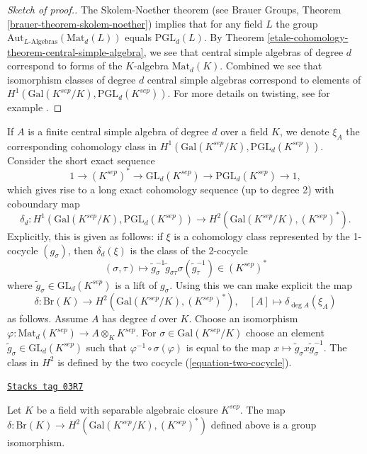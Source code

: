 \begin{proof}[Sketch of proof.]
The Skolem-Noether theorem (see
Brauer Groups, Theorem \ref{brauer-theorem-skolem-noether})
implies that for any field $L$ the group
$\text{Aut}_{L\text{-Algebras}}(\text{Mat}_d(L))$
equals $\text{PGL}_d(L)$. By
Theorem \ref{etale-cohomology-theorem-central-simple-algebra}, we see that
central simple algebras of degree $d$ correspond
to forms of the $K$-algebra $\text{Mat}_d(K)$.
Combined we see that isomorphism classes of degree $d$ central
simple algebras correspond to elements of
$H^1(\text{Gal}(K^{sep}/K), \text{PGL}_d(K^{sep}))$.
For more details on twisting, see for example
\cite{SilvermanEllipticCurves}.
\end{proof}

If $A$ is a finite central simple algebra of degree $d$ over a field $K$,
we denote $\xi_A$ the corresponding cohomology class in
$H^1(\text{Gal}(K^{sep}/K), \text{PGL}_d(K^{sep}))$.
Consider the short exact sequence
$$
1 \to (K^{sep})^* \to \text{GL}_d(K^{sep}) \to \text{PGL}_d(K^{sep}) \to 1,
$$
which gives rise to a long exact cohomology sequence (up to degree 2) with
coboundary map
$$
\delta_d :
H ^1(\text{Gal}(K^{sep}/K), \text{PGL}_d(K^{sep}))
\longrightarrow
H^2(\text{Gal}(K^{sep}/K), (K^{sep})^*).
$$
Explicitly, this is given as follows: if $\xi$ is a cohomology class
represented by the 1-cocycle $(g_\sigma)$, then $\delta_d(\xi)$ is the
class of the 2-cocycle
\begin{equation}
\label{equation-two-cocycle}
(\sigma, \tau)
\longmapsto
\tilde g_\sigma^{-1} \tilde g_{\sigma \tau} \sigma(\tilde g_\tau^{-1})
\in (K^{sep})^*
\end{equation}
where $\tilde g_\sigma \in \text{GL}_d(K^{sep})$ is a lift of $g_\sigma$.
Using this we can make explicit the map
$$
\delta : \text{Br}(K) \longrightarrow H^2(\text{Gal}(K^{sep}/K), (K^{sep})^*),
\quad
[A] \longmapsto \delta_{\deg A} (\xi_A)
$$
as follows. Assume $A$ has degree $d$ over $K$. Choose an isomorphism
$\varphi : \text{Mat}_d(K^{sep}) \to A \otimes_K K^{sep}$. For
$\sigma \in \text{Gal}(K^{sep}/K)$ choose an element
$\tilde g_\sigma \in \text{GL}_d(K^{sep})$ such that
$\varphi^{-1} \circ \sigma(\varphi)$ is equal to the map
$x \mapsto \tilde g_\sigma x \tilde g_\sigma^{-1}$. The class in $H^2$
is defined by the two cocycle (\ref{equation-two-cocycle}).

\begin{theorem}
\label{etale-cohomology-theorem-brauer-delta}
\href{https://stacks.math.columbia.edu/tag/03R7}{\texttt{Stacks tag 03R7}}

Let $K$ be a field with separable algebraic closure $K^{sep}$. The map
$\delta : \text{Br}(K) \to H^2(\text{Gal}(K^{sep}/K), (K^{sep})^*)$
defined above is a group isomorphism.
\end{theorem}

